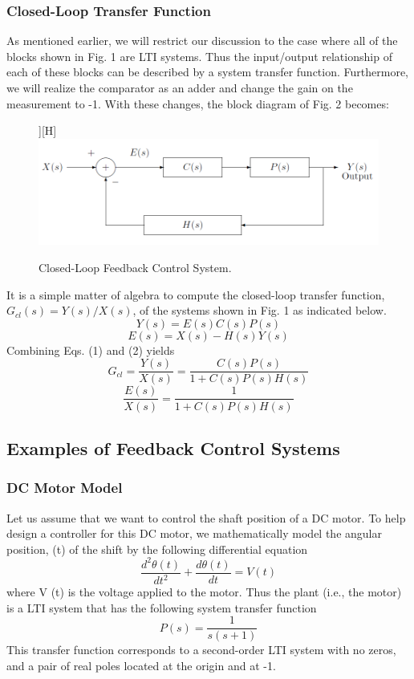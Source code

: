 \documentclass[12pt]{article}
\begin{document}
\subsubsection{Closed-Loop Transfer Function}
As mentioned earlier, we will restrict our discussion to the case where all of the blocks shown in Fig. 1
are LTI systems. Thus the input/output relationship of each of these blocks can be described by a system
transfer function. Furthermore, we will realize the comparator as an adder and change the gain on the
measurement to -1. With these changes, the block diagram of Fig. 2 becomes:
\begin{figure}][H]
\centering
\includegraphics[scale=0.4]{P2.jpg}
\caption{Closed-Loop Feedback Control System.}
\end{figure}
It is a simple matter of algebra to compute the closed-loop transfer function, $G_{cl}(s)=Y(s)/X(s)$, of the
systems shown in Fig. 1 as indicated below.
\begin{equation}
Y(s)=E(s)C(s)P(s)
\end{equation}
\begin{equation}
E(s)=X(s)-H(s)Y(s)
\end{equation}
Combining Eqs. (1) and (2) yields
\begin{equation}
G_{cl}=\frac{Y(s)}{X(s)}=\frac{C(s)P(s)}{1+C(s)P(s)H(s)}
\end{equation}
\begin{equation}
\frac{E(s)}{X(s)}=\frac{1}{1+C(s)P(s)H(s)}
\end{equation}
\subsection{Examples of Feedback Control Systems}
\subsubsection{DC Motor Model}
Let us assume that we want to control the shaft position of a DC motor. To help design a controller for
this DC motor, we mathematically model the angular position, (t) of the shift by the following differential
equation
\begin{equation}
\frac{d^2\theta(t)}{dt^2}+\frac{d\theta(t)}{dt}=V(t)
\end{equation}
where V (t) is the voltage applied to the motor. Thus the plant (i.e., the motor) is a LTI system that has
the following system transfer function
\begin{equation}
P(s)=\frac{1}{s(s+1)}
\end{equation}
This transfer function corresponds to a second-order LTI system with no zeros, and a pair of real poles
located at the origin and at -1.
\end{document}
